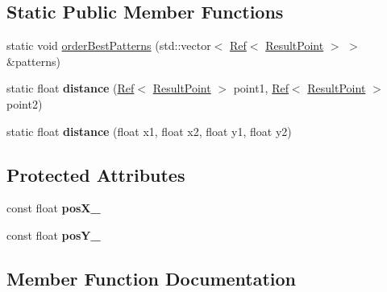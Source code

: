 \subsection*{Static Public Member Functions}
\begin{DoxyCompactItemize}
\item 
static void \mbox{\hyperlink{classzxing_1_1_result_point_a7dced99096b9de7128be7d777c008e1f}{order\+Best\+Patterns}} (std\+::vector$<$ \mbox{\hyperlink{classzxing_1_1_ref}{Ref}}$<$ \mbox{\hyperlink{classzxing_1_1_result_point}{Result\+Point}} $>$ $>$ \&patterns)
\item 
\mbox{\label{classzxing_1_1_result_point_ab6a682331b1da21854e0a0f6cd2917f8}} 
static float {\bfseries distance} (\mbox{\hyperlink{classzxing_1_1_ref}{Ref}}$<$ \mbox{\hyperlink{classzxing_1_1_result_point}{Result\+Point}} $>$ point1, \mbox{\hyperlink{classzxing_1_1_ref}{Ref}}$<$ \mbox{\hyperlink{classzxing_1_1_result_point}{Result\+Point}} $>$ point2)
\item 
\mbox{\label{classzxing_1_1_result_point_a6e904cea3ef70b391bef09ba1e454ec5}} 
static float {\bfseries distance} (float x1, float x2, float y1, float y2)
\end{DoxyCompactItemize}
\subsection*{Protected Attributes}
\begin{DoxyCompactItemize}
\item 
\mbox{\label{classzxing_1_1_result_point_a6a0c3835f8da0d93cdd1725a08a1b535}} 
const float {\bfseries pos\+X\+\_\+}
\item 
\mbox{\label{classzxing_1_1_result_point_a015022d6b67c2afe8c30f68e887ece4f}} 
const float {\bfseries pos\+Y\+\_\+}
\end{DoxyCompactItemize}


\subsection{Member Function Documentation}
\mbox{\label{classzxing_1_1_result_point_a7dced99096b9de7128be7d777c008e1f}} 
